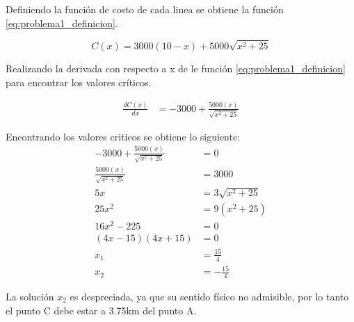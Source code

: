 Definiendo la función de costo de cada linea se obtiene la función \ref{eq:problema1_definicion}.

\begin{equation}
    C(x) = 3000(10-x) + 5000 \sqrt{x^2+25} \label{eq:problema1_definicion}
\end{equation}

Realizando la derivada con respecto a x de le función \ref{eq:problema1_definicion} para encontrar los valores críticos.

\begin{align*}
    \frac{dC(x)}{dx} & = -3000 + \frac{5000(x)}{\sqrt{x^2+25}}
\end{align*}

Encontrando los valores criticos se obtiene lo siguiente:
\begin{align*}
    -3000 + \frac{5000(x)}{\sqrt{x^2+25}} & =0               \\
    \frac{5000(x)}{\sqrt{x^2+25}}         & = 3000           \\
    5x                                    & = 3\sqrt{x^2+25} \\
    25x^2                                 & = 9(x^2+25)      \\
    16x^2     -225                        & = 0              \\
    (4x-15)(4x+15)                        & = 0              \\
    x_1                                   & = \frac{15}{4}   \\
    x_2                                   & = -\frac{15}{4}
\end{align*}

La solución $x_2$ es despreciada, ya que su sentido físico no admisible, por lo tanto el punto C debe estar a 3.75km del punto A.
